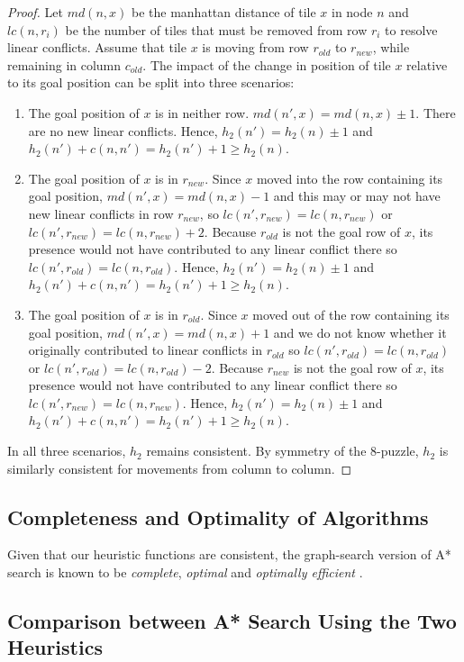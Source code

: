 \documentclass[11pt, a4paper]{article}
\theoremstyle{definition}
\begin{document}
\begin{proof}
  Let $md(n, x)$ be the manhattan distance of tile $x$ in node $n$ and $lc(n, r_i)$ be the number of tiles that must be removed from row $r_i$ to resolve linear conflicts.
  Assume that tile $x$ is moving from row $r_{old}$ to $r_{new}$, while remaining in column $c_{old}$. The impact of the change in position of tile $x$ relative to its goal position can be split into three scenarios:
  \begin{enumerate}
    \item The goal position of $x$ is in neither row. $md(n', x) = md(n, x) \pm 1$. There are no new linear conflicts. Hence, $h_2(n') = h_2(n) \pm 1$ and $h_2(n') + c(n, n') = h_2(n') + 1 \geq h_2(n)$.
    \item The goal position of $x$ is in $r_{new}$. Since $x$ moved into the row containing its goal position, $md(n', x) = md(n, x) - 1$ and this may or may not have new linear conflicts in row $r_{new}$, so $lc(n', r_{new}) = lc(n, r_{new})$ or $lc(n', r_{new}) = lc(n, r_{new}) + 2$. Because $r_{old}$ is not the goal row of $x$, its presence would not have contributed to any linear conflict there so $lc(n', r_{old}) = lc(n, r_{old})$. Hence, $h_2(n') = h_2(n) \pm 1$ and $h_2(n') + c(n, n') = h_2(n') + 1 \geq h_2(n)$.
    \item The goal position of $x$ is in $r_{old}$. Since $x$ moved out of the row containing its goal position, $md(n', x) = md(n, x) + 1$ and we do not know whether it originally contributed to linear conflicts in $r_{old}$ so $lc(n', r_{old}) = lc(n, r_{old})$ or $lc(n', r_{old}) = lc(n, r_{old}) - 2$. Because $r_{new}$ is not the goal row of $x$, its presence would not have contributed to any linear conflict there so $lc(n', r_{new}) = lc(n, r_{new})$. Hence, $h_2(n') = h_2(n) \pm 1$ and $h_2(n') + c(n, n') = h_2(n') + 1 \geq h_2(n)$.
  \end{enumerate}
  In all three scenarios, $h_2$ remains consistent. By symmetry of the 8-puzzle, $h_2$ is similarly consistent for movements from column to column.
\end{proof}

\subsection{Completeness and Optimality of Algorithms}
Given that our heuristic functions are consistent, the graph-search version of A* search is known to be \emph{complete}, \emph{optimal} and \emph{optimally efficient} \cite{russell_norvig_davis_2010}.

\subsection{Comparison between A* Search Using the Two Heuristics}



\end{document}
